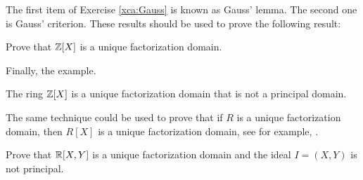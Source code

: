 The first item of Exercise \ref{xca:Gauss} is known as Gauss' lemma.  The
second one is Gauss' criterion. These results should be used to prove the
following result: 

\begin{exercise}
\label{xca:Z[X]_UFD}
    Prove that $\mathbb{Z}[X]$ is a unique factorization domain. 
\end{exercise}

Finally, the example. 

\begin{example}
	The ring $\mathbb{Z}[X]$ is a unique factorization 
	domain that is not a principal domain. 	
\end{example}

The same technique could be used to prove that if 
$R$ is a unique factorization domain, then $R[X]$ 
is a unique factorization domain, see
for example, \cite[Chapter III, Theorem 6.14]{MR600654}.  

\begin{exercise}
    Prove that $\mathbb{R}[X,Y]$ is a unique factorization domain 
    and the ideal $I=(X,Y)$ is not principal. 
\end{exercise}




